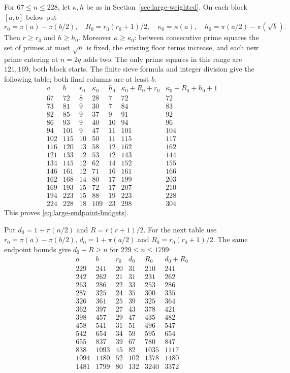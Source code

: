 \documentclass[11pt]{article}
\numberwithin{equation}{section}
\theoremstyle{definition}\newtheorem{definition}[theorem]{Definition}
\theoremstyle{remark}\newtheorem{remark}[theorem]{Remark}
\begin{document}
For $67\le n\le228$, let $\kappa,h$ be as in
Section~\ref{sec:large-weighted}. On each block $[a,b]$ below put
\[
 r_0=\pi(a)-\pi(b/2),\quad R_0=r_0(r_0+1)/2,\quad
 \kappa_0=\kappa(a),\quad h_0=\pi(a/2)-\pi(\sqrt b).
\]
Then $r\ge r_0$ and $h\ge h_0$. Moreover $\kappa\ge\kappa_0$:
between consecutive prime squares the set of primes at most $\sqrt n$
is fixed, the existing floor terms increase, and each new prime entering
at $n=2q$ adds two. The only prime squares in this range are $121,169$,
both block starts. The finite sieve formula and integer division give
the following table; both final columns are at least $b$.
\[
\begin{array}{rr|rrr|rr}
a&b&r_0&\kappa_0&h_0&\kappa_0+R_0+r_0&\kappa_0+R_0+h_0+1\\\hline
67&72&8&28&7&72&72\\
73&81&9&30&7&84&83\\
82&85&9&37&9&91&92\\
86&93&9&40&10&94&96\\
94&101&9&47&11&101&104\\
102&115&10&50&11&115&117\\
116&120&13&58&12&162&162\\
121&133&12&53&12&143&144\\
134&145&12&62&14&152&155\\
146&161&12&71&16&161&166\\
162&168&14&80&17&199&203\\
169&193&15&72&17&207&210\\
194&223&15&88&19&223&228\\
224&228&18&109&23&298&304
\end{array}
\]
This proves \eqref{eq:large-endpoint-budgets}.

Put $d_0=1+\pi(n/2)$ and $R=r(r+1)/2$. For the next table use
$r_0=\pi(a)-\pi(b/2)$, $d_0=1+\pi(a/2)$ and
$R_0=r_0(r_0+1)/2$.
The same endpoint bounds give $d_0+R\ge n$ for $229\le n\le1799$:
\[
\begin{array}{rr|rrrr}
a&b&r_0&d_0&R_0&d_0+R_0\\\hline
229&241&20&31&210&241\\
242&262&21&31&231&262\\
263&286&22&33&253&286\\
287&325&24&35&300&335\\
326&361&25&39&325&364\\
362&397&27&43&378&421\\
398&457&29&47&435&482\\
458&541&31&51&496&547\\
542&654&34&59&595&654\\
655&837&39&67&780&847\\
838&1093&45&82&1035&1117\\
1094&1480&52&102&1378&1480\\
1481&1799&80&132&3240&3372
\end{array}
\]
\end{document}

